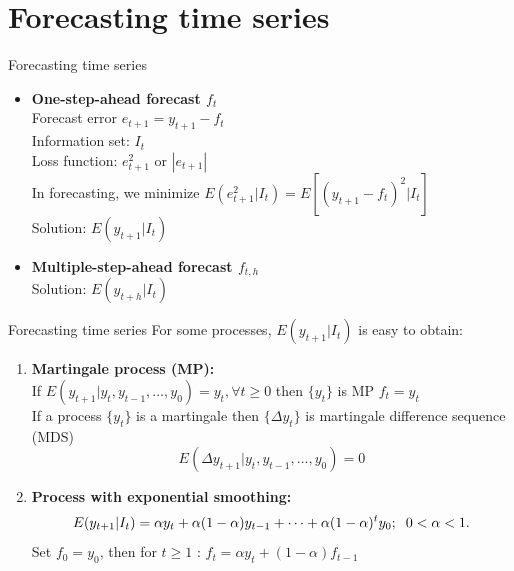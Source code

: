 \documentclass{beamer}
\begin{document}

\section{Forecasting time series}

\begin{frame}{Forecasting time series}
\begin{itemize}
\item \textbf{One-step-ahead forecast $f_t$}\\
Forecast error $e_{t+1}=y_{t+1}-f_t$\\
Information set: $I_t$\\
Loss function: $e^2_{t+1}$ or $|e_{t+1}|$\\
In forecasting, we minimize $E(e^2_{t+1}|I_t)=E[(y_{t+1}-f_t)^2|I_t]$\\
Solution: $E(y_{t+1}|I_t)$
\vspace{0.5cm}
\item \textbf{Multiple-step-ahead forecast $f_{t,h}$}\\
Solution: $E(y_{t+h}|I_t)$

\end{itemize}
\end{frame}



\begin{frame}{Forecasting time series}
For some processes, $E(y_{t+1}|I_t)$ is easy to obtain:
\begin{enumerate}
\item \textbf{Martingale process (MP):}\\
If $E(y_{t+1}|y_{t},y_{t-1},\dots,y_{0})=y_t, \forall t \geq 0$ then $\{y_t\}$ is MP $f_t=y_t$\\
If a process $\{y_t\}$ is a martingale then $\{\Delta y_t\}$ is martingale difference sequence (MDS) 
$$ E(\Delta y_{t+1}|y_{t},y_{t-1},\dots,y_{0})=0$$
\item \textbf{Process with exponential smoothing:}
$$E(y_{t+1}|I_t)=\alpha y_t + \alpha (1- \alpha) y_{t-1}+ \dots + \alpha(1-\alpha)^ty_0; 
\hspace{0.2cm} 0 < \alpha < 1.$$
Set $f_0=y_0$, then for $t\geq 1$ : $f_t = \alpha y_t + (1-\alpha)f_{t-1}$
\end{enumerate}
\end{frame}
\end{document}
